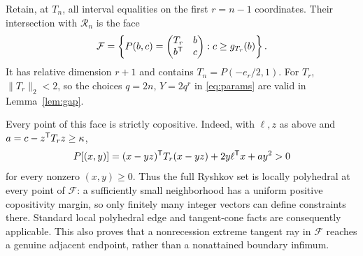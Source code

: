 \documentclass[11pt]{article}
\theoremstyle{remark}\newtheorem{remark}[theorem]{Remark}
\newcommand{\Ry}{\mathcal R}\newcommand{\tr}{\operatorname{tr}}
\newcommand{\norm}[1]{\lVert #1\rVert}
\begin{document}
Retain, at $T_n$, all interval equalities on the first $r=n-1$ coordinates. Their intersection with $\Ry_n$ is the face
\begin{equation}\label{eq:face}
 \mathcal F=\left\{P(b,c)=\begin{pmatrix}T_r&b\\b^{\mathsf T}&c\end{pmatrix}: c\ge g_{T_r}(b)\right\}.
\end{equation}
It has relative dimension $r+1$ and contains $T_n=P(-e_r/2,1)$. For $T_r$, $\norm{T_r}_2<2$, so the choices $q=2n$, $Y=2q^r$ in \eqref{eq:params} are valid in Lemma~\ref{lem:gap}.

Every point of this face is strictly copositive. Indeed, with $\ell,z$ as above and $a=c-z^{\mathsf T} T_rz\ge\kappa$,
\[
 P[(x,y)]=(x-yz)^{\mathsf T} T_r(x-yz)+2y\ell^{\mathsf T} x+ay^2>0
\]
for every nonzero $(x,y)\ge0$. Thus the full Ryshkov set is locally polyhedral at every point of $\mathcal F$: a sufficiently small neighborhood has a uniform positive copositivity margin, so only finitely many integer vectors can define constraints there. Standard local polyhedral edge and tangent-cone facts are consequently applicable. This also proves that a nonrecession extreme tangent ray in $\mathcal F$ reaches a genuine adjacent endpoint, rather than a nonattained boundary infimum.
\end{document}
